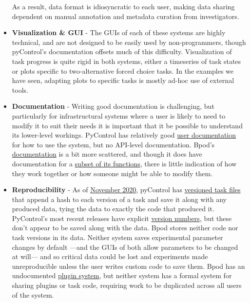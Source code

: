 \begin{itemize}[resume*, before=\vspace{0pt}, after=\vspace{\baselineskip}]
    As a result, data format is idiosyncratic to each user, making data sharing dependent on manual annotation and metadata curation from investigators. 
    \item \textbf{Visualization \& GUI} - The GUIs of each of these systems are highly technical, and are not designed to be easily used by non-programmers, though pyControl's documentation offsets much of this difficulty. Visualization of task progress is quite rigid in both systems, either a timeseries of task states or plots specific to two-alternative forced choice tasks. In the examples we have seen, adapting plots to specific tasks is mostly ad-hoc use of external tools.
    \item \textbf{Documentation} - Writing good documentation is challenging, but particularly for infrastructural systems where a user is likely to need to modify it to suit their needs it is important that it be possible to understand its lower-level workings. PyControl has relatively good \href{https://pycontrol.readthedocs.io/en/latest/}{user documentation} for how to use the system, but no API-level documentation. Bpod's \href{https://sites.google.com/site/bpoddocumentation/home}{documentation} is a bit more scattered, and though it does have documentation for a \href{https://sites.google.com/site/bpoddocumentation/user-guide/function-reference}{subset of its functions}, there is little indication of how they work together or how someone might be able to modify them.
    \item \textbf{Reproducibility} - As of \href{https://github.com/pyControl/code/blob/cc6e7ab67c18388dea85b3ac48ac66a65ffa12f8/ChangeLog.txt#L74}{November 2020}, pyControl has \href{https://pycontrol.readthedocs.io/en/latest/user-guide/pycontrol-data/#versioned-task-files}{versioned task files} that append a hash to each version of a task and save it along with any produced data, tying the data to exactly the code that produced it. PyControl's most recent releases have explicit \href{https://github.com/pyControl/code/releases}{version numbers}, but these don't appear to be saved along with the data. Bpod stores neither code nor task versions in its data. Neither system saves experimental parameter changes by default ---and the GUIs of both allow parameters to be changed at will--- and so critical data could be lost and experiments made unreproducible unless the user writes custom code to save them. Bpod has an undocumented \href{https://github.com/sanworks/Bpod_Gen2/commit/10ad997555086afb93dfc1080091acaa58d740f9}{plugin system}, but neither system has a formal system for sharing plugins or task code, requiring work to be duplicated across all users of the system.

\end{itemize}
